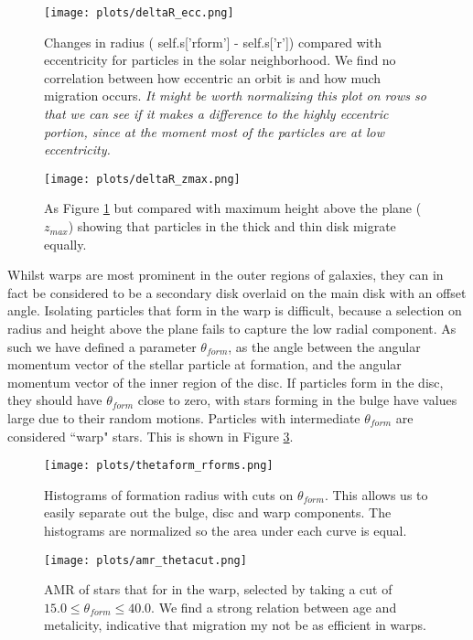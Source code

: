 \documentclass[usenatbib, useAMS,usegraphicx]{mn2e}
\newcommand{\red}{\color{red}}
\begin{document}
\begin{figure}
   \centering
   \texttt{[image: plots/deltaR\_ecc.png]}
   \caption{Changes in radius ( self.s['rform'] - self.s['r']) compared with eccentricity for particles in the solar neighborhood. We find no correlation between how eccentric an orbit is and how much migration occurs. \emph{ \red It might be worth normalizing this plot on rows so that we can see if it makes a difference to the highly eccentric portion, since at the moment most of the particles are at low eccentricity.}}
   \label{fig:deltaRecc}
\end{figure}

\begin{figure}
   \centering
   \texttt{[image: plots/deltaR\_zmax.png]}
   \caption{As Figure \ref{fig:deltaRecc} but compared with maximum height above the plane ($z_{max}$) showing that particles in the thick and thin disk migrate equally. }
   \label{fig:delatRzmax}
\end{figure}


Whilst warps are most prominent in the outer regions of galaxies, they can in fact be considered to be a secondary disk overlaid on the main disk with an offset angle. Isolating particles that form in the warp is difficult, because a selection on radius and height above the plane fails to capture the low radial component. As such we have defined a parameter $\theta_{form}$, as the angle between the angular momentum vector of the stellar particle at formation, and the angular momentum vector of the inner region of the disc. If particles form in the disc, they should have $\theta_{form}$ close to zero, with stars forming in the bulge have values large due to their random motions. Particles with intermediate $\theta_{form}$ are considered ``warp" stars. This is shown in Figure \ref{fig:thetaform_rforms}.

\begin{figure}
   \centering
   \texttt{[image: plots/thetaform\_rforms.png]}
   \caption{Histograms of formation radius with cuts on $\theta_{form}$. This allows us to easily separate out the bulge, disc and warp components. The histograms are normalized so the area under each curve is equal.}
   \label{fig:thetaform_rforms}
\end{figure}

\begin{figure}
   \centering
   \texttt{[image: plots/amr\_thetacut.png]}
   \caption{AMR of stars that for in the warp, selected by taking a cut of $15.0 \leq \theta_{form} \leq 40.0$. We find a strong relation between age and metalicity, indicative that migration my not be as efficient in warps.}
   \label{fig:amr_thetacut}
\end{figure}
\end{document}

